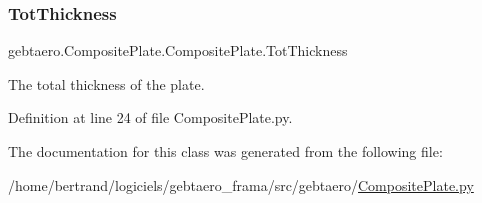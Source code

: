 \subsubsection{\texorpdfstring{Tot\+Thickness}{TotThickness}}
{\footnotesize\ttfamily gebtaero.\+Composite\+Plate.\+Composite\+Plate.\+Tot\+Thickness}



The total thickness of the plate. 



Definition at line 24 of file Composite\+Plate.\+py.



The documentation for this class was generated from the following file\+:\begin{DoxyCompactItemize}
\item 
/home/bertrand/logiciels/gebtaero\+\_\+frama/src/gebtaero/\hyperlink{_composite_plate_8py}{Composite\+Plate.\+py}\end{DoxyCompactItemize}
